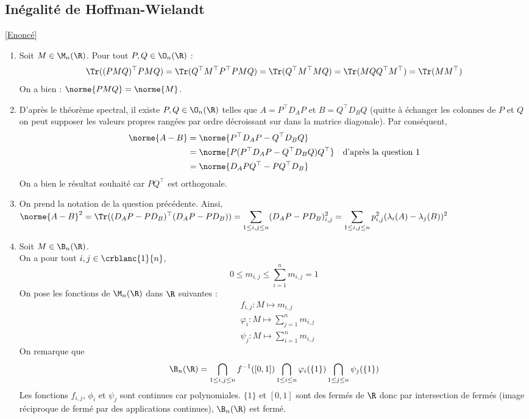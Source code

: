 \documentclass[8pt]{book}
\begin{document}
	\subsection{Inégalité de Hoffman-Wielandt}
	\label{Inégalité de Hoffman-Wielandt corrigé}
	\textcolor{blue}{\hyperref[Inégalité de Hoffman-Wielandt]{[Enoncé]}}\\
	\begin{enumerate}[leftmargin=*]
		\item Soit $M\in\M_n(\R)$. Pour tout $P,Q\in\O_n(\R)$ :
		\[\Tr((PMQ)^\top PMQ)=\Tr(Q^\top M^\top P^\top PMQ)=\Tr(Q^\top M^\top M Q)=\Tr(MQQ^\top M^\top)=\Tr(MM^\top)\]
		On a bien : $\norme{PMQ}=\norme{M}$.
		\item D'après le théorème spectral, il existe $P,Q\in\O_n(\R)$ telles que $A=P^\top D_AP$ et $B=Q^\top D_BQ$ (quitte à échanger les colonnes de $P$ et $Q$ on peut supposer les valeurs propres rangées par ordre décroissant sur dans la matrice diagonale).
		Par conséquent, 
		\begin{align*}
			\norme{A-B}&=\norme{P^\top D_AP-Q^\top D_BQ}\\
			&=\norme{P(P^\top D_AP-Q^\top D_BQ)Q^\top} &\text{d'après la question 1}\\
			&=\norme{D_APQ^\top-PQ^\top D_B}
		\end{align*}
		On a bien le résultat souhaité car $PQ^\top$ est orthogonale.
		\item On prend la notation de la question précédente. Ainsi,
		$\norme{A-B}^2=\Tr((D_AP-PD_B)^\top(D_AP-PD_B))=\displaystyle\sum_{1\leq i,j\leq n}(D_AP-PD_B)_{i,j}^2=\sum_{1\leq i,j\leq n}p_{i,j}^2(\lambda_i(A)-\lambda_j(B))^2$
		\item Soit $M\in\B_n(\R)$.\\
		On a pour tout $i,j\in\crblanc{1}{n}$, 
		\[0\leq m_{i,j}\leq \sum_{i=1}^nm_{i,j}=1\]
		On pose les fonctions de $\M_n(\R)$ dans $\R$ suivantes :
		\begin{align*}
			&f_{i,j}:M\mapsto m_{i,j}\\
			&\varphi_i:M\mapsto \sum_{j=1}^nm_{i,j}\\
			&\psi_j:M\mapsto \sum_{i=1}^nm_{i,j}
		\end{align*}
		On remarque que \[\B_n(\R)=\bigcap_{1\leq i,j\leq n}f^{-1}([0,1])\bigcap_{1\leq i\leq n}\varphi_i(\{1\})\bigcap_{1\leq j\leq n}\psi_j(\{1\})\]
		Les fonctions $f_{i,j}$, $\phi_i$ et $\psi_j$ sont continues car polynomiales. $\{1\}$ et $[0,1]$ sont des fermés de $\R$ donc par intersection de fermés (image réciproque de fermé par des applications continues), $\B_n(\R)$ est fermé.

\end{enumerate}
\end{document}
